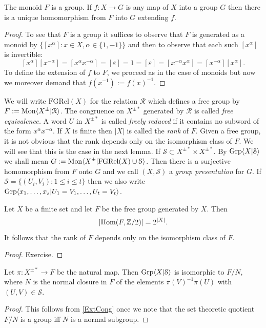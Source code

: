 \begin{prop} The monoid $F$ is a group. If $f : X \rightarrow G$ is any map of
    $X$ into a group $G$ then there is a unique homomorphism from $F$ into $G$
    extending $f$.
\end{prop}
\begin{proof} To see that $F$ is a group it suffices to observe that $F$ is
    generated as a monoid by \(\{[x^\alpha] : x \in X, \alpha \in \{1,-1\}\}\)
    and then to observe that each such \([x^\alpha]\) is invertible: \[
    [x^\alpha] [x^{-\alpha}] = [x^\alpha x^{-\alpha}] = [\varepsilon] = 1 =
    [\varepsilon] = [x^{-\alpha}x^\alpha] = [x^{-\alpha}][x^\alpha].\] To
    define the extension of $f$ to $F$, we proceed as in the case of
    monoids but now we moreover demand that $f(x^{-1}) := f(x)^{-1}$.
\end{proof}

\begin{defns} We will write $\mathrm{FGRel}(X)$ for the relation $\mathcal{R}$
    which defines a free group by $F := \mathrm{Mon}\langle X^\pm | \mathcal{R}\rangle$. The
    congruence on $X^{\pm *}$ generated by $\mathcal{R}$ is called \emph{free
    equivalence.} A word $U$ in $X^{\pm *}$ is called \emph{freely reduced} if
    it contains no subword of the form $x^\alpha x^{-\alpha}$. If $X$ is finite
    then $|X|$ is called the \emph{rank} of $F$. Given a free group, it is not
    obvious that the rank depends only on the isomorphism class of $F$. We will
    see that this is the case in the next lemma. If $\mathcal{S} \subset X^{\pm
    *}\times X^{\pm *}$. By $\mathrm{Grp}\langle X|\mathcal{S}\rangle$ we shall mean $G:=
    \mathrm{Mon}\langle X^{\pm}| \mathrm{FGRel}(X) \cup \mathcal{S}\rangle$. Then there is a
    surjective homomorphism from $F$ onto $G$ and we call $(X,\mathcal{S})$ a
    \emph{group presentation} for $G$. If $\mathcal{S} = \{(U_i,V_i) : 1 \le i
    \le t\}$ then we also write $\mathrm{Grp}\langle x_1,\dots,x_s| U_1 = V_1, \dots, U_t =
    V_t\rangle$.
\end{defns}

\begin{lem} Let $X$ be a finite set and let $F$ be the free group generated by
    $X$. Then \[| \mathrm{Hom}(F, \mathbb{Z}/2)| = 2^{|X|}.\] It follows that the rank of $F$
    depends only on the isomorphism class of $F$.
\end{lem}
\begin{proof} Exercise.
\end{proof}

\begin{prop} Let $\pi: X^{\pm *} \rightarrow F$ be the natural map. Then
    $\mathrm{Grp}\langle X|\mathcal{S}\rangle$ is isomorphic to $F/N$, where $N$ is the normal
    closure in $F$ of the elements $\pi(V)^{-1}\pi(U)$ with $(U,V)\in
    \mathcal{S}$.
\end{prop}
\begin{proof} This follows from \ref{ExtCong} once we note that the set
    theoretic quotient $F/N$ is a group iff $N$ is a normal subgroup.
\end{proof}

